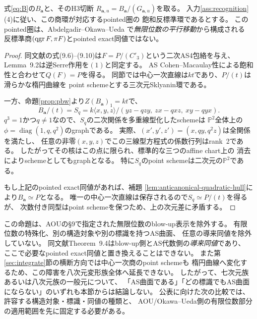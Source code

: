 \begin{proposition}
\label{prop:aou-infinite-order-exclusion}
式\eqref{eq:B}の$B_{\mathbf a}$と、そのH3切断
$R_{\mathbf a,u}=B_{\mathbf a}/(G_{\mathbf a,u})$を取る。
入力\ref{ass:recognition}(4)に従い、この商環が対応するpointed圏の
飽和反標準環であるとする。
このpointed圏は、Abdelgadir--Okawa--Ueda
\cite[\S9]{AOUCubic}で\emph{無限位数の平行移動}から構成される
反標準商$(\operatorname{qgr} F,\pi F)$とpointed exact同値ではない。
\end{proposition}
\begin{proof}
同文献の式(9.6)--(9.10)は$F=P/(C'_3)$という二次AS4包絡を与え、
Lemma~9.2は逆Serre作用を$(1)$と同定する。
AS Cohen--Macaulay性による飽和性と合わせて$Q(F)=P$を得る。
同節では中心一次直線は$kt$であり、$P/(t)$は滑らかな楕円曲線を
point schemeとする三次元Sklyanin環である。

一方、命題\ref{prop:pbw}より$Z(B_{\mathbf a})_1=kt$で、
\[
 B_{\mathbf a}/(t)=S_q
 =k\langle x,y,z\rangle/(yz-qzy,\ zx-qxz,\ xy-qyx).
\]
$q^3=1$かつ$q\ne1$なので、$S_q$の二次関係を多重線型化したschemeは
$\mathbb P^2$全体上の$\phi=\operatorname{diag}(1,q,q^2)$のgraphである。
実際、$(x',y',z')=(x,qy,q^2z)$は全関係を満たし、
任意の非零$(x,y,z)$でこの三線型方程式の係数行列はrank~2である。
したがってその核はこの点に限られ、標準的な三つのaffine chart上の
消去によりschemeとしてもgraphとなる。
特に$S_q$のpoint schemeは二次元の$\mathbb P^2$である。

もし上記のpointed exact同値があれば、補題
\ref{lem:anticanonical-quadratic-hull}により$B_{\mathbf a}\simeq P$となる。
唯一の中心一次直線は保存されるので$S_q\simeq P/(t)$を得るが、
次数付き同型はpoint schemeを保つため、上の次元差に矛盾する。
\end{proof}

\begin{remark}[除外の範囲]\label{rem:aou-exclusion-scope}
この命題は、AOUの\S9で指定された無限位数のblow-up表示を除外する。
有限位数の特殊化、別の構造対象や別の標識を持つAS曲面、
任意の導来同値を除外していない。
同文献Theorem~9.4はblow-up側とAS代数側の\emph{導来同値}であり、
ここで必要なpointed exact同値と置き換えることはできない。
また第\ref{sec:integrate}節の横断方向では中心一次商のpoint schemeも
楕円曲線へ変化するため、この障害を八次元変形族全体へ延長できない。
したがって、七次元族あるいは八次元族の一般元について、
「AS曲面である」「どの標識でもAS曲面にならない」のいずれも本節からは結論しない。
公表に向けた次の比較では、許容する構造対象・標識・同値の種類と、
AOU/Okawa--Ueda側の有限位数部分の適用範囲を先に固定する必要がある。
\end{remark}
